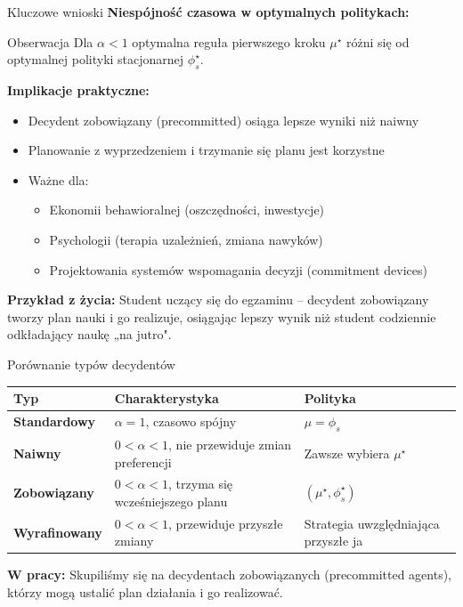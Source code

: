 \begin{frame}{Kluczowe wnioski}
\textbf{Niespójność czasowa w optymalnych politykach:}

\begin{block}{Obserwacja}
Dla $\alpha < 1$ optymalna reguła pierwszego kroku $\mu^\star$ różni się od optymalnej polityki stacjonarnej $\phi_s^\star$.
\end{block}

\vspace{0.3em}
\textbf{Implikacje praktyczne:}
\begin{itemize}
    \item Decydent zobowiązany (precommitted) osiąga lepsze wyniki niż naiwny
    \item Planowanie z wyprzedzeniem i trzymanie się planu jest korzystne
    \item Ważne dla:
    \begin{itemize}
        \item Ekonomii behawioralnej (oszczędności, inwestycje)
        \item Psychologii (terapia uzależnień, zmiana nawyków)
        \item Projektowania systemów wspomagania decyzji (commitment devices)
    \end{itemize}
\end{itemize}

\vspace{0.3em}
\textbf{Przykład z życia:} Student uczący się do egzaminu -- decydent zobowiązany tworzy plan nauki i go realizuje, osiągając lepszy wynik niż student codziennie odkładający naukę „na jutro".
\end{frame}

\begin{frame}{Porównanie typów decydentów}
\begin{table}[h!]
\centering
\small
\begin{tabular}{lp{5cm}p{4cm}}
\toprule
\textbf{Typ} & \textbf{Charakterystyka} & \textbf{Polityka} \\
\midrule
\textbf{Standardowy} & $\alpha = 1$, czasowo spójny & $\mu = \phi_s$ \\
\midrule
\textbf{Naiwny} & $0 < \alpha < 1$, nie przewiduje zmian preferencji & Zawsze wybiera $\mu^\star$ \\
\midrule
\textbf{Zobowiązany} & $0 < \alpha < 1$, trzyma się wcześniejszego planu & $(\mu^\star, \phi_s^\star)$ \\
\midrule
\textbf{Wyrafinowany} & $0 < \alpha < 1$, przewiduje przyszłe zmiany & Strategia uwzględniająca przyszłe ja \\
\bottomrule
\end{tabular}
\end{table}

\vspace{0.3em}
\textbf{W pracy:} Skupiliśmy się na decydentach zobowiązanych (precommitted agents), którzy mogą ustalić plan działania i go realizować.
\end{frame}

